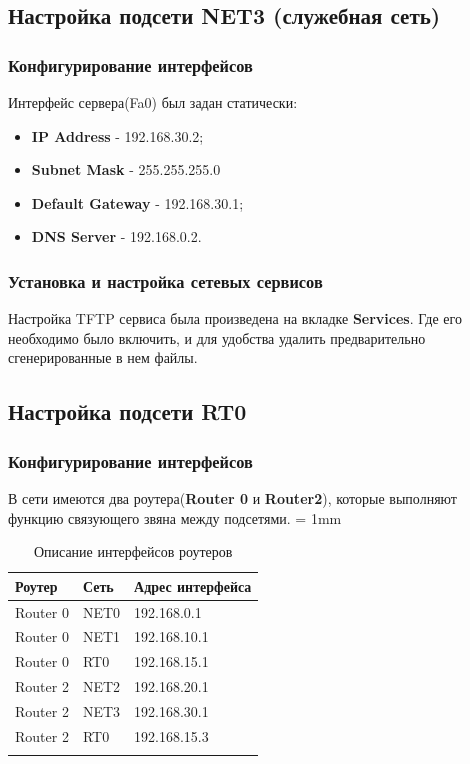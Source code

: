 \subsection{Настройка подсети NET3 (служебная сеть)}
\subsubsection{Конфигурирование интерфейсов}
Интерфейс сервера(Fa0) был задан статически:
\begin{itemize}
\item \textbf{IP Address} - 192.168.30.2;
\item \textbf{Subnet Mask} - 255.255.255.0
\item \textbf{Default Gateway} - 192.168.30.1;
\item \textbf{DNS Server} - 192.168.0.2.
\end{itemize}
\subsubsection{Установка и настройка сетевых сервисов}
Настройка TFTP сервиса была произведена на вкладке \textbf{Services}. Где его необходимо было включить, и для удобства удалить предварительно сгенерированные в нем файлы.

\subsection{Настройка подсети RT0}
\subsubsection{Конфигурирование интерфейсов}
В сети имеются два роутера(\textbf{Router 0} и \textbf{Router2}), которые выполняют функцию связующего звяна между подсетями.
\tabulinesep = 1mm
\begin{longtabu} to \textwidth {|X[c , m ] |X[c , m ] | X[c, m ]|}\firsthline\hline
\textbf{Роутер}&\textbf{Сеть}&\textbf{Адрес интерфейса}\\ \hline \endfirsthead
Router 0&NET0&192.168.0.1\\ \hline
Router 0&NET1&192.168.10.1\\ \hline
Router 0&RT0&192.168.15.1\\ \hline
Router 2&NET2&192.168.20.1\\ \hline
Router 2&NET3&192.168.30.1\\ \hline
Router 2&RT0&192.168.15.3\\ \hline
\caption{Описание интерфейсов роутеров}
\end{longtabu}
